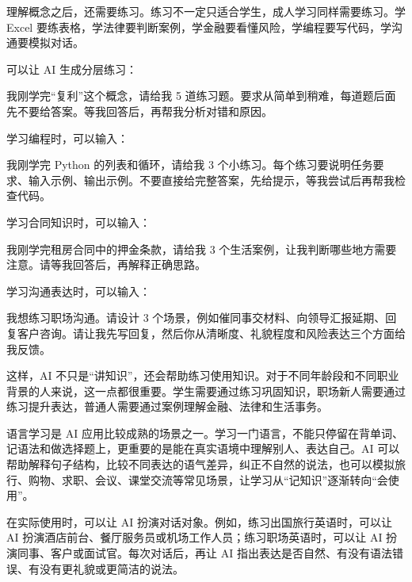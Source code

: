 
理解概念之后，还需要练习。练习不一定只适合学生，成人学习同样需要练习。学 Excel 要练表格，学法律要判断案例，学金融要看懂风险，学编程要写代码，学沟通要模拟对话。

可以让 AI 生成分层练习：

\begin{tcolorbox}[promptbox]
我刚学完“复利”这个概念，请给我 5 道练习题。要求从简单到稍难，每道题后面先不要给答案。等我回答后，再帮我分析对错和原因。
\end{tcolorbox}

学习编程时，可以输入：

\begin{tcolorbox}[promptbox]
我刚学完 Python 的列表和循环，请给我 3 个小练习。每个练习要说明任务要求、输入示例、输出示例。不要直接给完整答案，先给提示，等我尝试后再帮我检查代码。
\end{tcolorbox}

学习合同知识时，可以输入：

\begin{tcolorbox}[promptbox]
我刚学完租房合同中的押金条款，请给我 3 个生活案例，让我判断哪些地方需要注意。请等我回答后，再解释正确思路。
\end{tcolorbox}

学习沟通表达时，可以输入：

\begin{tcolorbox}[promptbox]
我想练习职场沟通。请设计 3 个场景，例如催同事交材料、向领导汇报延期、回复客户咨询。请让我先写回复，然后你从清晰度、礼貌程度和风险表达三个方面给我反馈。
\end{tcolorbox}

这样，AI 不只是“讲知识”，还会帮助练习使用知识。对于不同年龄段和不同职业背景的人来说，这一点都很重要。学生需要通过练习巩固知识，职场新人需要通过练习提升表达，普通人需要通过案例理解金融、法律和生活事务。


语言学习是 AI 应用比较成熟的场景之一。学习一门语言，不能只停留在背单词、记语法和做选择题上，更重要的是能在真实语境中理解别人、表达自己。AI 可以帮助解释句子结构，比较不同表达的语气差异，纠正不自然的说法，也可以模拟旅行、购物、求职、会议、课堂交流等常见场景，让学习从“记知识”逐渐转向“会使用”。

在实际使用时，可以让 AI 扮演对话对象。例如，练习出国旅行英语时，可以让 AI 扮演酒店前台、餐厅服务员或机场工作人员；练习职场英语时，可以让 AI 扮演同事、客户或面试官。每次对话后，再让 AI 指出表达是否自然、有没有语法错误、有没有更礼貌或更简洁的说法。

